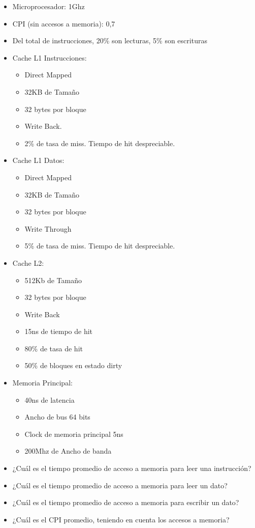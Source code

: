 \begin{itemize}
 \item Microprocesador: 1Ghz
 \item CPI (sin accesos a memoria): 0,7
 \item Del total de instrucciones, 20\% son lecturas, 5\% son escrituras
 \item Cache L1 Instrucciones: 
 \begin{itemize}
  \item Direct Mapped
  \item 32KB de Tamaño
  \item 32 bytes por bloque
  \item Write Back.
  \item 2\% de tasa de miss. Tiempo de hit despreciable.
 \end{itemize}
  \item Cache L1 Datos:
  \begin{itemize}
   \item Direct Mapped
   \item 32KB de Tamaño
   \item 32 bytes por bloque
   \item Write Through
   \item 5\% de tasa de miss. Tiempo de hit despreciable.
  \end{itemize}
  \item Cache L2:
  \begin{itemize}
   \item 512Kb de Tamaño
   \item 32 bytes por bloque
   \item Write Back
   \item 15ns de tiempo de hit
   \item 80\% de tasa de hit
   \item 50\% de bloques en estado dirty
  \end{itemize}
 \item Memoria Principal:
 \begin{itemize}
  \item 40ns de latencia
  \item Ancho de bus 64 bits
  \item Clock de memoria principal 5ns
  \item 200Mhz de Ancho de banda
 \end{itemize}
\end{itemize}

\begin{itemize}
 \item ¿Cuál es el tiempo promedio de acceso a memoria para leer una instrucción?
 \item ¿Cuál es el tiempo promedio de acceso a memoria para leer un dato?
 \item ¿Cuál es el tiempo promedio de acceso a memoria para escribir un dato?
 \item ¿Cuál es el CPI promedio, teniendo en cuenta los accesos a memoria?
\end{itemize}
	
